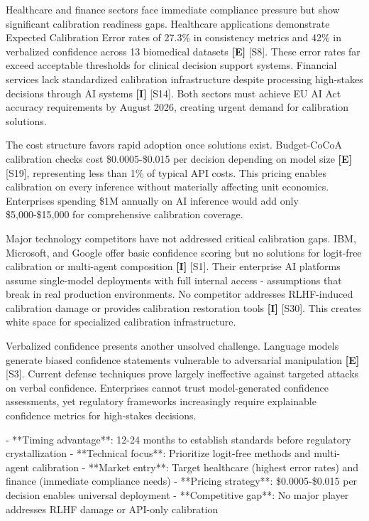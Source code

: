 \documentclass[a4paper,11pt]{article}
\newcommand{\elabel}{\textbf{\textcolor{ecolor}{[E]}}}
\newcommand{\ilabel}{\textbf{\textcolor{icolor}{[I]}}}
\begin{document}
Healthcare and finance sectors face immediate compliance pressure but show significant calibration readiness gaps. Healthcare applications demonstrate Expected Calibration Error rates of 27.3\% in consistency metrics and 42\% in verbalized confidence across 13 biomedical datasets \elabel{} \textcolor{primary}{[S8]}. These error rates far exceed acceptable thresholds for clinical decision support systems. Financial services lack standardized calibration infrastructure despite processing high-stakes decisions through AI systems \ilabel{} \textcolor{primary}{[S14]}. Both sectors must achieve EU AI Act accuracy requirements by August 2026, creating urgent demand for calibration solutions.


The cost structure favors rapid adoption once solutions exist. Budget-CoCoA calibration checks cost \$0.0005-\$0.015 per decision depending on model size \elabel{} \textcolor{primary}{[S19]}, representing less than 1\% of typical API costs. This pricing enables calibration on every inference without materially affecting unit economics. Enterprises spending \$1M annually on AI inference would add only \$5,000-\$15,000 for comprehensive calibration coverage.


Major technology competitors have not addressed critical calibration gaps. IBM, Microsoft, and Google offer basic confidence scoring but no solutions for logit-free calibration or multi-agent composition \ilabel{} \textcolor{primary}{[S1]}. Their enterprise AI platforms assume single-model deployments with full internal access - assumptions that break in real production environments. No competitor addresses RLHF-induced calibration damage or provides calibration restoration tools \ilabel{} \textcolor{primary}{[S30]}. This creates white space for specialized calibration infrastructure.


Verbalized confidence presents another unsolved challenge. Language models generate biased confidence statements vulnerable to adversarial manipulation \elabel{} \textcolor{primary}{[S3]}. Current defense techniques prove largely ineffective against targeted attacks on verbal confidence. Enterprises cannot trust model-generated confidence assessments, yet regulatory frameworks increasingly require explainable confidence metrics for high-stakes decisions.


\begin{decisionbox}
- **Timing advantage**: 12-24 months to establish standards before regulatory crystallization
- **Technical focus**: Prioritize logit-free methods and multi-agent calibration
- **Market entry**: Target healthcare (highest error rates) and finance (immediate compliance needs)
- **Pricing strategy**: \$0.0005-\$0.015 per decision enables universal deployment
- **Competitive gap**: No major player addresses RLHF damage or API-only calibration
\end{decisionbox}
\end{document}
